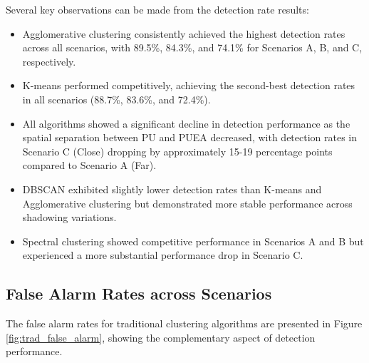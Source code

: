 Several key observations can be made from the detection rate results:

\begin{itemize}
    \item Agglomerative clustering consistently achieved the highest detection rates across all scenarios, with 89.5\%, 84.3\%, and 74.1\% for Scenarios A, B, and C, respectively.
    
    \item K-means performed competitively, achieving the second-best detection rates in all scenarios (88.7\%, 83.6\%, and 72.4\%).
    
    \item All algorithms showed a significant decline in detection performance as the spatial separation between PU and PUEA decreased, with detection rates in Scenario C (Close) dropping by approximately 15-19 percentage points compared to Scenario A (Far).
    
    \item DBSCAN exhibited slightly lower detection rates than K-means and Agglomerative clustering but demonstrated more stable performance across shadowing variations.
    
    \item Spectral clustering showed competitive performance in Scenarios A and B but experienced a more substantial performance drop in Scenario C.
\end{itemize}

\subsection{False Alarm Rates across Scenarios}

The false alarm rates for traditional clustering algorithms are presented in Figure \ref{fig:trad_false_alarm}, showing the complementary aspect of detection performance.

